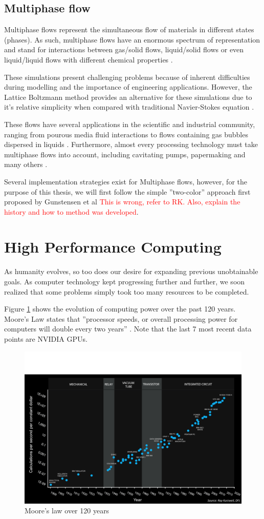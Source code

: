 \documentclass[12pt]{book}
\begin{document}
\subsection{Multiphase flow}
Multiphase flows represent the simultaneous flow of materials in different states (phases). As such, multiphase flows have an enormous spectrum of representation and stand for interactions between gas/solid flows, liquid/solid flows or even liquid/liquid flows with different chemical properties \cite{multiphase}.\par
These simulations present challenging problems because of inherent difficulties during modelling and the importance of engineering applications. However, the Lattice Boltzmann method provides an alternative for these simulations due to it's relative simplicity when compared with traditional Navier-Stokes equation \cite{chenDoolenMP}.
\par These flows have several applications in the scientific and industrial community, ranging from pourous media fluid interactions \cite{pourous} to flows containing gas bubbles dispersed in liquids \cite{gasBubble}. Furthermore, almost every processing technology must take multiphase flows into account, including cavitating pumps, papermaking and many others \cite{multiphase}.
\par Several implementation strategies exist for Multiphase flows, however, for the purpose of this thesis, we will first follow the simple ''two-color'' approach first proposed by Gunstensen et al \cite{gunstensen} \textcolor{red}{This is wrong, refer to RK. Also, explain the history and how to method was developed}.


\section{High Performance Computing}
As humanity evolves, so too does our desire for expanding previous unobtainable goals. As computer technology kept progressing further and further, we soon realized that some problems simply took too many resources to be completed.\par
Figure \ref{fig:moore} shows the evolution of computing power over the past 120 years. Moore's Law states that ''processor speeds, or overall processing power for computers will double every two years'' \cite{moore}. Note that the last 7 most recent data points are NVIDIA GPUs.

\begin{figure}[H]
\centering
  \includegraphics[width=0.6\linewidth]{Resources/Images/moore120.png}
  \caption{Moore's law over 120 years}
  \label{fig:moore}
\end{figure}
\end{document}
